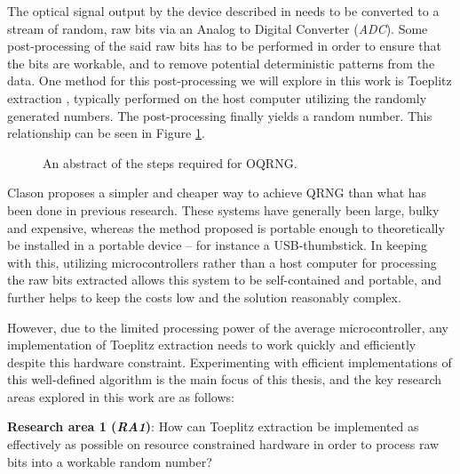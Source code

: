 The optical signal output by the device described in \cite{Clason2023} needs to be converted to a stream of random, raw bits via an Analog to Digital Converter (\emph{ADC}). Some post-processing of the said raw bits has to be performed in order to ensure that the bits are workable, and to remove potential deterministic patterns from the data. One method for this post-processing we will explore in this work is Toeplitz extraction \cite{toeplitz}, typically performed on the host computer utilizing the randomly generated numbers. The post-processing finally yields a random number. This relationship can be seen in Figure \ref{fig:linear-system}.

\begin{figure}[ht] \centering {} \caption{An abstract of the steps required for OQRNG.}
\label{fig:linear-system} \end{figure}

Clason proposes a simpler and cheaper way to achieve QRNG \cite{Clason2023} than what has been done in previous research. These systems have generally been large, bulky and expensive, whereas the method proposed is portable enough to theoretically be installed in a portable device -- for instance a USB-thumbstick. In keeping with this, utilizing microcontrollers rather than a host computer for processing the raw bits extracted allows this system to be self-contained and portable, and further helps to keep the costs low and the solution reasonably complex.

However, due to the limited processing power of the average microcontroller, any implementation of Toeplitz extraction needs to work quickly and efficiently despite this hardware constraint. Experimenting with efficient implementations of this well-defined algorithm is the main focus of this thesis, and the key research areas explored in this work are as follows:

\textbf{Research area 1 (\emph{RA1})}: How can Toeplitz extraction be implemented as effectively as possible on resource constrained hardware in order to process raw bits into a workable random number?

